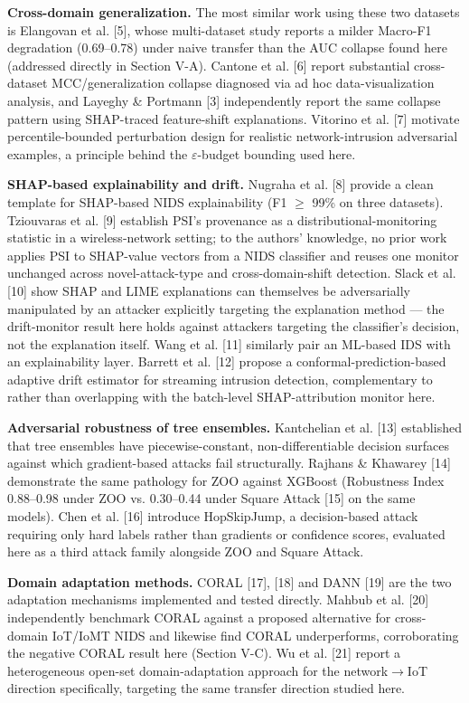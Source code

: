 \documentclass[conference]{IEEEtran}
\begin{document}
\textbf{Cross-domain generalization.} The most similar work using these two datasets is Elangovan et al. [5], whose multi-dataset study reports a milder Macro-F1 degradation (0.69--0.78) under naive transfer than the AUC collapse found here (addressed directly in Section V-A). Cantone et al. [6] report substantial cross-dataset MCC/generalization collapse diagnosed via ad hoc data-visualization analysis, and Layeghy \& Portmann [3] independently report the same collapse pattern using SHAP-traced feature-shift explanations. Vitorino et al. [7] motivate percentile-bounded perturbation design for realistic network-intrusion adversarial examples, a principle behind the $\varepsilon$-budget bounding used here.

\textbf{SHAP-based explainability and drift.} Nugraha et al. [8] provide a clean template for SHAP-based NIDS explainability (F1 $\geq$ 99\% on three datasets). Tziouvaras et al. [9] establish PSI's provenance as a distributional-monitoring statistic in a wireless-network setting; to the authors' knowledge, no prior work applies PSI to SHAP-value vectors from a NIDS classifier and reuses one monitor unchanged across novel-attack-type and cross-domain-shift detection. Slack et al. [10] show SHAP and LIME explanations can themselves be adversarially manipulated by an attacker explicitly targeting the explanation method --- the drift-monitor result here holds against attackers targeting the classifier's decision, not the explanation itself. Wang et al. [11] similarly pair an ML-based IDS with an explainability layer. Barrett et al. [12] propose a conformal-prediction-based adaptive drift estimator for streaming intrusion detection, complementary to rather than overlapping with the batch-level SHAP-attribution monitor here.

\textbf{Adversarial robustness of tree ensembles.} Kantchelian et al. [13] established that tree ensembles have piecewise-constant, non-differentiable decision surfaces against which gradient-based attacks fail structurally. Rajhans \& Khawarey [14] demonstrate the same pathology for ZOO against XGBoost (Robustness Index 0.88--0.98 under ZOO vs. 0.30--0.44 under Square Attack [15] on the same models). Chen et al. [16] introduce HopSkipJump, a decision-based attack requiring only hard labels rather than gradients or confidence scores, evaluated here as a third attack family alongside ZOO and Square Attack.

\textbf{Domain adaptation methods.} CORAL [17], [18] and DANN [19] are the two adaptation mechanisms implemented and tested directly. Mahbub et al. [20] independently benchmark CORAL against a proposed alternative for cross-domain IoT/IoMT NIDS and likewise find CORAL underperforms, corroborating the negative CORAL result here (Section V-C). Wu et al. [21] report a heterogeneous open-set domain-adaptation approach for the network$\rightarrow$IoT direction specifically, targeting the same transfer direction studied here.
\end{document}
